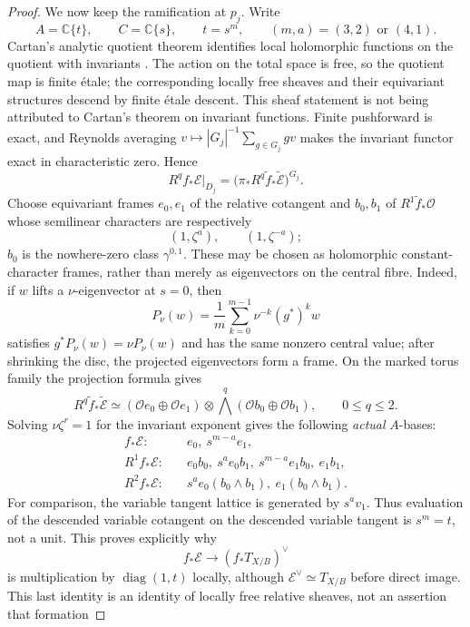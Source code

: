 \begin{proof}
We now keep the ramification at $p_j$.  Write
\[
 A=\mathbb C\{t\},\qquad C=\mathbb C\{s\},\qquad t=s^m,
 \qquad (m,a)=(3,2)\text{ or }(4,1).
\]
Cartan's analytic quotient theorem identifies local holomorphic functions on
the quotient with invariants \cite[\S1, Theorem~1, pp.~1--2]{Cartan1954Quotient}.
The action on the total space is free, so the quotient map is finite \'etale;
the corresponding locally free sheaves and their equivariant structures
descend by finite \'etale descent.  This sheaf statement is not being
attributed to Cartan's theorem on invariant functions.  Finite pushforward
is exact, and Reynolds averaging
$v\mapsto |G_j|^{-1}\sum_{g\in G_j}gv$ makes the invariant functor exact in
characteristic zero.  Hence
\[
 R^qf_*\mathcal E|_{D_j}
 =\bigl(\pi_*R^q\widetilde f_*\widetilde{\mathcal E}\bigr)^{G_j}.
\tag{11.3a}
\]
Choose equivariant frames $e_0,e_1$ of the relative cotangent and
$b_0,b_1$ of $R^1\widetilde f_*\mathcal O$ whose semilinear characters are
respectively
\[
 (1,\zeta^a),\qquad (1,\zeta^{-a});
\]
$b_0$ is the nowhere-zero class $\gamma^{0,1}$.  These may be chosen as
holomorphic constant-character frames, rather than merely as eigenvectors on
the central fibre.  Indeed, if $w$ lifts a $\nu$-eigenvector at $s=0$, then
\[
 P_\nu(w)=\frac1m\sum_{k=0}^{m-1}\nu^{-k}(g^*)^kw
\]
satisfies $g^*P_\nu(w)=\nu P_\nu(w)$ and has the same nonzero central value;
after shrinking the disc, the projected eigenvectors form a frame.  On the
marked torus family the projection formula gives
\[
 R^q\widetilde f_*\widetilde{\mathcal E}
 \simeq
 (\mathcal O e_0\oplus\mathcal O e_1)
 \otimes
 \bigwedge^q(\mathcal O b_0\oplus\mathcal O b_1),
 \qquad 0\le q\le2.
\]
Solving
$\nu\zeta^r=1$ for the invariant exponent gives the following \emph{actual}
$A$-bases:
\begin{align*}
 f_*\mathcal E:\quad& e_0,\ s^{m-a}e_1,\\
 R^1f_*\mathcal E:\quad&
 e_0b_0,\ s^ae_0b_1,\ s^{m-a}e_1b_0,\ e_1b_1,\\
 R^2f_*\mathcal E:\quad&
 s^ae_0(b_0\wedge b_1),\ e_1(b_0\wedge b_1).
\tag{11.4}
\end{align*}
For comparison, the variable tangent lattice is generated by $s^av_1$.
Thus evaluation of the descended variable cotangent on the descended
variable tangent is $s^m=t$, not a unit.  This proves explicitly why
\[
 f_*\mathcal E\longrightarrow(f_*T_{X/B})^\vee
\]
is multiplication by $\operatorname{diag}(1,t)$ locally, although
$\mathcal E^\vee\simeq T_{X/B}$ before direct image.  This last identity is
an identity of locally free relative sheaves, not an assertion that formation

\end{proof}
